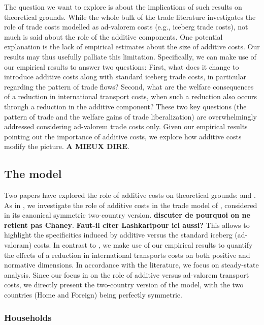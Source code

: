 \documentclass[a4paper,11pt]{article}
\begin{document}
The question we want to explore is about the implications of such results on theoretical grounds. While the whole bulk of the trade literature investigates the role of trade costs modelled as ad-valorem costs (e.g., iceberg trade costs), not much is said about the role of the additive components. One potential explanation is the lack of empirical estimates about the size of additive costs. Our results may thus usefully palliate this limitation. Specifically, we can make use of our empirical results to answer two questions: First, what does it change to introduce additive costs along with standard iceberg trade costs, in particular regarding the pattern of trade flows? Second, what are the welfare consequences of a reduction in international transport costs, when such a reduction also occurs through a reduction in the additive component? These two key questions (the pattern of trade and the welfare gains of trade liberalization) are overwhelmingly addressed considering ad-valorem trade costs only. Given our empirical results pointing out the importance of additive costs, we explore how additive costs modify the picture. \textbf{A MIEUX DIRE}.


\subsection{The model}


Two papers have explored the role of additive costs on theoretical grounds: \cite{Irrazabal_2015} and \cite{sorensen2014}. As in \cite{sorensen2014}, we investigate the role of additive costs in the trade model of \cite{melitz}, considered in its canonical symmetric two-country version. \textbf{discuter de pourquoi on ne retient pas Chaney}. \textbf{Faut-il citer Lashkaripour ici aussi?} This allows to highlight the specificities induced by additive versus the standard iceberg (ad-valoram) costs. In contrast to \cite{sorensen2014}, we make use of our empirical results to quantify the effects of a reduction in international transports costs on both positive and normative dimensions. In accordance with the literature, we focus on steady-state analysis. Since our focus in on the role of additive versus ad-valorem transport costs, we directly present the two-country version of the model, with the two countries (Home and Foreign) being perfectly symmetric.

\subsubsection{Households}
\end{document}

